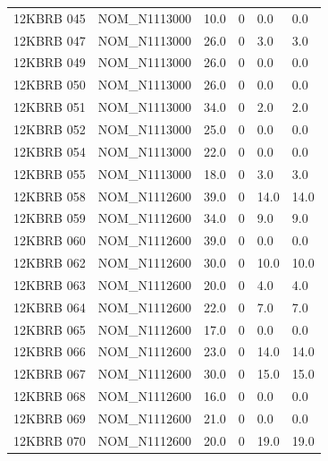 \begin{table}[htbp]
\begin{tabular}{llllll}
12KBRB 045 & NOM\_N1113000 & 10.0 & 0 & 0.0 & 0.0 \\
12KBRB 047 & NOM\_N1113000 & 26.0 & 0 & 3.0 & 3.0 \\
12KBRB 049 & NOM\_N1113000 & 26.0 & 0 & 0.0 & 0.0 \\
12KBRB 050 & NOM\_N1113000 & 26.0 & 0 & 0.0 & 0.0 \\
12KBRB 051 & NOM\_N1113000 & 34.0 & 0 & 2.0 & 2.0 \\
12KBRB 052 & NOM\_N1113000 & 25.0 & 0 & 0.0 & 0.0 \\
12KBRB 054 & NOM\_N1113000 & 22.0 & 0 & 0.0 & 0.0 \\
12KBRB 055 & NOM\_N1113000 & 18.0 & 0 & 3.0 & 3.0 \\
12KBRB 058 & NOM\_N1112600 & 39.0 & 0 & 14.0 & 14.0 \\
12KBRB 059 & NOM\_N1112600 & 34.0 & 0 & 9.0 & 9.0 \\
12KBRB 060 & NOM\_N1112600 & 39.0 & 0 & 0.0 & 0.0 \\
12KBRB 062 & NOM\_N1112600 & 30.0 & 0 & 10.0 & 10.0 \\
12KBRB 063 & NOM\_N1112600 & 20.0 & 0 & 4.0 & 4.0 \\
12KBRB 064 & NOM\_N1112600 & 22.0 & 0 & 7.0 & 7.0 \\
12KBRB 065 & NOM\_N1112600 & 17.0 & 0 & 0.0 & 0.0 \\
12KBRB 066 & NOM\_N1112600 & 23.0 & 0 & 14.0 & 14.0 \\
12KBRB 067 & NOM\_N1112600 & 30.0 & 0 & 15.0 & 15.0 \\
12KBRB 068 & NOM\_N1112600 & 16.0 & 0 & 0.0 & 0.0 \\
12KBRB 069 & NOM\_N1112600 & 21.0 & 0 & 0.0 & 0.0 \\
12KBRB 070 & NOM\_N1112600 & 20.0 & 0 & 19.0 & 19.0 \\
\bottomrule
\end{tabular}
\end{table}
